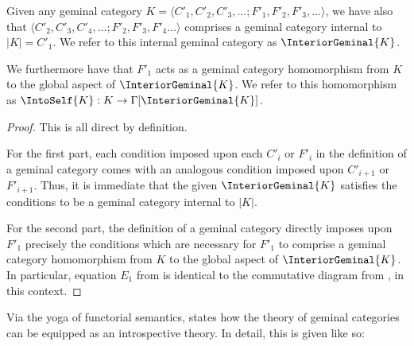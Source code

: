 \begin{theorem}\label{GeminalContainsGeminal}
Given any geminal category $K = \langle C'_1, C'_2, C'_3, \ldots; F'_1, F'_2, F'_3, \ldots \rangle$, we have also that $\langle C'_2, C'_3, C'_4, \ldots; F'_2, F'_3, F'_4 \ldots \rangle$ comprises a geminal category internal to $|K| = C'_1$. We refer to this internal geminal category as $\InteriorGeminal{K}$.

We furthermore have that $F'_1$ acts as a geminal category homomorphism from $K$ to the global aspect of $\InteriorGeminal{K}$. We refer to this homomorphism as $\IntoSelf{K} : K \to \Gamma[\InteriorGeminal{K}]$.
\end{theorem}
\begin{proof}
This is all direct by definition.

For the first part, each condition imposed upon each $C'_{i}$ or $F'_{i}$ in the definition of a geminal category comes with an analogous condition imposed upon $C'_{i + 1}$ or $F'_{i + 1}$. Thus, it is immediate that the given $\InteriorGeminal{K}$ satisfies the conditions to be a geminal category internal to $|K|$.

For the second part, the definition of a geminal category directly imposes upon $F'_1$ precisely the conditions which are necessary for $F'_1$ to comprise a geminal category homomorphism from $K$ to the global aspect of $\InteriorGeminal{K}$. In particular, equation $E_1$ from  is identical to the commutative diagram from , in this context.
\end{proof}

Via the yoga of functorial semantics,  states how the theory of geminal categories can be equipped as an introspective theory. In detail, this is given like so:

